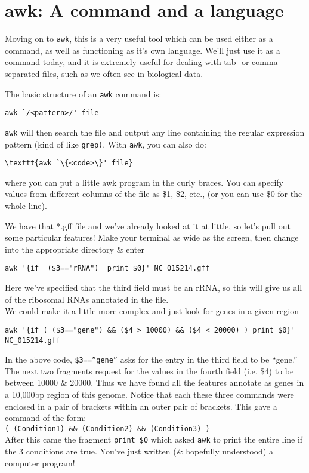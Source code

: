 \section{awk: A command and a language}
Moving on to \texttt{awk}, this is a very useful tool which can be used either as a command, as well as functioning as it's own language.
We'll just use it as a command today, and it is extremely useful for dealing with tab- or comma-separated files, such as we often see in biological data.\\
\begin{information}
The basic structure of an \texttt{awk} command is: 
\begin{lstlisting}[style=command_syntax]
awk `/<pattern>/' file
\end{lstlisting}
\texttt{awk} will then search the file and output any line containing the regular expression pattern (kind of like \texttt{grep)}.
With \texttt{awk}, you can also do: 
\begin{lstlisting}[style=command_syntax]
\texttt{awk `\{<code>\}' file} 
\end{lstlisting}
where you can put a little awk program in the curly braces. 
You can specify values from different columns of the file as \$1, \$2, etc., (or you can use \$0 for the whole line).
\end{information}

\begin{steps}
We have that *.gff file and we've already looked at it at little, so let's pull out some particular features!
Make your terminal as wide as the screen, then change into the appropriate directory \& enter
\begin{lstlisting}
awk '{if  ($3=="rRNA")  print $0}' NC_015214.gff
\end{lstlisting}
Here we've specified that the third field must be an rRNA, so this will give us all of the ribosomal RNAs annotated in the file. \\

We could make it a little more complex and just look for genes in a given region
\begin{lstlisting}
awk '{if ( ($3=="gene") && ($4 > 10000) && ($4 < 20000) ) print $0}' NC_015214.gff
\end{lstlisting}
\end{steps}
\begin{note}
In the above code, \texttt{\$3==''gene''} asks for the entry in the third field to be ``gene.''
The next two fragments request for the values in the fourth field (i.e. \$4) to be between 10000 \& 20000.
Thus we have found all the features annotate as genes in a 10,000bp region of this genome.
Notice that each these three commands were enclosed in a pair of brackets within an outer pair of brackets.
This gave a command of the form: \\
\texttt{( (Condition1) \&\& (Condition2) \&\& (Condition3) )} \\
After this came the fragment \texttt{print \$0} which asked \texttt{awk} to print the entire line if the 3 conditions are true.
You've just written (\& hopefully understood) a computer program!
\end{note}

